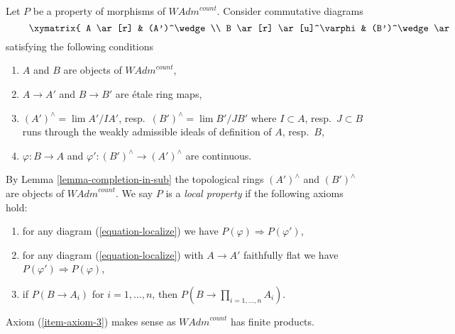 \begin{situation}
\label{situation-local-property}
Let $P$ be a property of morphisms of $\textit{WAdm}^{count}$.
Consider commutative diagrams
\begin{equation}
\label{equation-localize}
\vcenter{
\xymatrix{
A \ar[r] & (A')^\wedge \\
B \ar[r] \ar[u]^\varphi & (B')^\wedge \ar[u]_{\varphi'}
}
}
\end{equation}
satisfying the following conditions
\begin{enumerate}
\item $A$ and $B$ are objects of $\textit{WAdm}^{count}$,
\item $A \to A'$ and $B \to B'$ are \'etale ring maps,
\item $(A')^\wedge = \lim A'/IA'$, resp.\  $(B')^\wedge = \lim B'/JB'$
where $I \subset A$, resp.\ $J \subset B$
runs through the weakly admissible ideals of definition of $A$, resp.\ $B$,
\item $\varphi : B \to A$ and $\varphi' : (B')^\wedge \to (A')^\wedge$
are continuous.
\end{enumerate}
By Lemma \ref{lemma-completion-in-sub} the topological rings
$(A')^\wedge$ and $(B')^\wedge$ are objects of $\textit{WAdm}^{count}$.
We say $P$ is a {\it local property} if the following axioms hold:
\begin{enumerate}
\item
\label{item-axiom-1}
for any diagram (\ref{equation-localize}) we have
$P(\varphi) \Rightarrow P(\varphi')$,
\item
\label{item-axiom-2}
for any diagram (\ref{equation-localize}) with $A \to A'$
faithfully flat we have
$P(\varphi') \Rightarrow P(\varphi)$,
\item
\label{item-axiom-3}
if $P(B \to A_i)$ for $i = 1, \ldots, n$, then
$P(B \to \prod_{i = 1, \ldots, n} A_i)$.
\end{enumerate}
Axiom (\ref{item-axiom-3})
makes sense as $\textit{WAdm}^{count}$ has finite products.
\end{situation}

